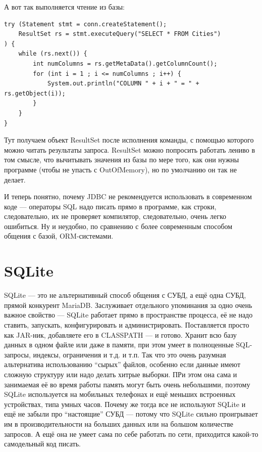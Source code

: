 \documentclass[a5paper]{article}
\begin{document}
А вот так выполняется чтение из базы:

\begin{verbatim}
try (Statement stmt = conn.createStatement();
    ResultSet rs = stmt.executeQuery("SELECT * FROM Cities")
) {
    while (rs.next()) {
        int numColumns = rs.getMetaData().getColumnCount();
        for (int i = 1 ; i <= numColumns ; i++) {
            System.out.println("COLUMN " + i + " = " + rs.getObject(i));
        }
    }
}
\end{verbatim}

Тут получаем объект ResultSet после исполнения команды, с помощью которого можно читать результаты запроса. ResultSet можно попросить работать лениво  в том смысле, что вычитывать значения из базы по мере того, как они нужны программе (чтобы не упасть с OutOfMemory), но по умолчанию он так не делает.

И теперь понятно, почему JDBC не рекомендуется использовать в современном коде --- операторы SQL надо писать прямо в программе, как строки, следовательно, их не проверяет компилятор, следовательно, очень легко ошибиться. Ну и неудобно, по сравнению с более современным способом общения с базой, ORM-системами.

\section{SQLite}

SQLite --- это не альтернативный способ общения с СУБД, а ещё одна СУБД, прямой конкурент MariaDB. Заслуживает отдельного упоминания за одно очень важное свойство --- SQLite работает прямо в пространстве процесса, её не надо ставить, запускать, конфигурировать и администрировать. Поставляется просто как JAR-ник, добавляете его в CLASSPATH --- и готово. Хранит всю базу данных в одном файле или даже в памяти, при этом умеет в полноценные SQL-запросы, индексы, ограничения и т.д. и т.п. Так что это очень разумная альтернатива использованию ``сырых'' файлов, особенно если данные имеют сложную структуру или надо делать хитрые выборки. ПРи этом она сама и занимаемая её во время работы память могут быть очень небольшими, поэтому SQLite используется на мобильных телефонах и ещё меньших встроенных устройствах, типа умных часов. Почему же тогда все не используют SQLite и ещё не забыли про ``настоящие'' СУБД --- потому что SQLite сильно проигрывает им в производительности на больших данных или на большом количестве запросов. А ещё она не умеет сама по себе работать по сети, приходится какой-то самодельный код писать.
\end{document}
